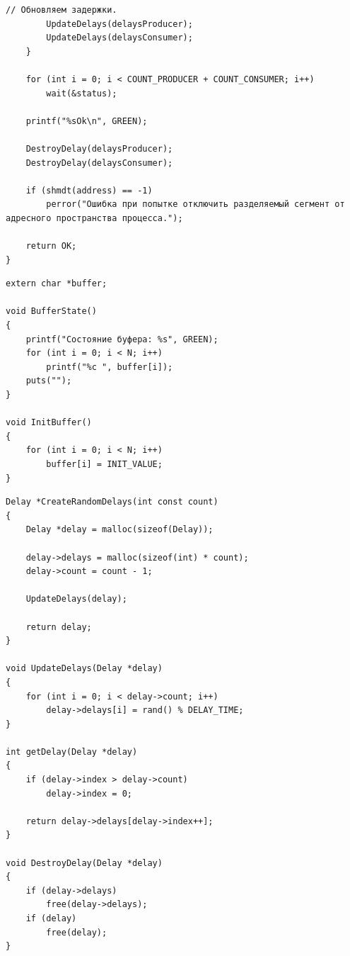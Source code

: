\begin{lstlisting}[label=some-code,caption=Главный файл main]
		// Обновляем задержки.
		UpdateDelays(delaysProducer);
		UpdateDelays(delaysConsumer);
	}

	for (int i = 0; i < COUNT_PRODUCER + COUNT_CONSUMER; i++)
		wait(&status);

	printf("%sOk\n", GREEN);

	DestroyDelay(delaysProducer);
	DestroyDelay(delaysConsumer);

	if (shmdt(address) == -1)
		perror("Ошибка при попытке отключить разделяемый сегмент от адресного пространства процесса.");

	return OK;
}

\end{lstlisting}

\begin{lstlisting}[label=some-code,caption=Файл\, для работы с буфером]
extern char *buffer;

void BufferState()
{
	printf("Состояние буфера: %s", GREEN);
	for (int i = 0; i < N; i++)
		printf("%c ", buffer[i]);
	puts("");
}

void InitBuffer()
{
	for (int i = 0; i < N; i++)
		buffer[i] = INIT_VALUE;
}
\end{lstlisting}

\begin{lstlisting}[label=some-code,caption=Файл\, для работы с задержками]
Delay *CreateRandomDelays(int const count)
{
	Delay *delay = malloc(sizeof(Delay));

	delay->delays = malloc(sizeof(int) * count);
	delay->count = count - 1;

	UpdateDelays(delay);

	return delay;
}

void UpdateDelays(Delay *delay)
{
	for (int i = 0; i < delay->count; i++)
		delay->delays[i] = rand() % DELAY_TIME;
}

int getDelay(Delay *delay)
{
	if (delay->index > delay->count)
		delay->index = 0;

	return delay->delays[delay->index++];
}

void DestroyDelay(Delay *delay)
{
	if (delay->delays)
		free(delay->delays);
	if (delay)
		free(delay);
}
\end{lstlisting}


